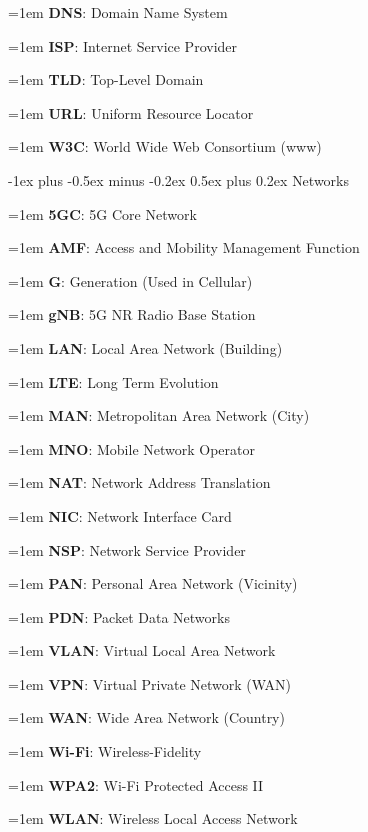 \documentclass[letterpaper,8pt]{extarticle}
\makeatletter
\newcommand{\definition}[2]{
  \hangindent=1em
  \textbf{#1}: #2%
}
\renewcommand{\subsection}{\@startsection{subsection}{2}{0mm}%
  {-1ex plus -0.5ex minus -0.2ex}%
  {0.5ex plus 0.2ex}%
{\color{h2}\normalfont\fontsize{6}{6}\selectfont\bfseries}}
\makeatother
\begin{document}
\begin{multicols*}{5}
  \begin{multicols*}{2}

    \definition{DNS}{Domain Name System}

    \definition{ISP}{Internet Service Provider}

    \definition{TLD}{Top-Level Domain}

    \definition{URL}{Uniform Resource Locator}

    \definition{W3C}{World Wide Web Consortium (www)}

  \end{multicols*}

  \subsection{Networks}

  \begin{multicols*}{2}

    \definition{5GC}{5G Core Network}

    \definition{AMF}{Access and Mobility Management Function}

    \definition{G}{Generation (Used in Cellular)}

    \definition{gNB}{5G NR Radio Base Station}

    \definition{LAN}{Local Area Network (Building)}

    \definition{LTE}{Long Term Evolution}

    \definition{MAN}{Metropolitan Area Network (City)}

    \definition{MNO}{Mobile Network Operator}

    \definition{NAT}{Network Address Translation}

    \definition{NIC}{Network Interface Card}

    \definition{NSP}{Network Service Provider}

    \definition{PAN}{Personal Area Network (Vicinity)}

    \definition{PDN}{Packet Data Networks}

    \definition{VLAN}{Virtual Local Area Network}

    \definition{VPN}{Virtual Private Network (WAN)}

    \definition{WAN}{Wide Area Network (Country)}

    \definition{Wi-Fi}{Wireless-Fidelity}

    \definition{WPA2}{Wi-Fi Protected Access II}

    \definition{WLAN}{Wireless Local Access Network}


\end{multicols*}
\end{multicols*}
\end{document}

